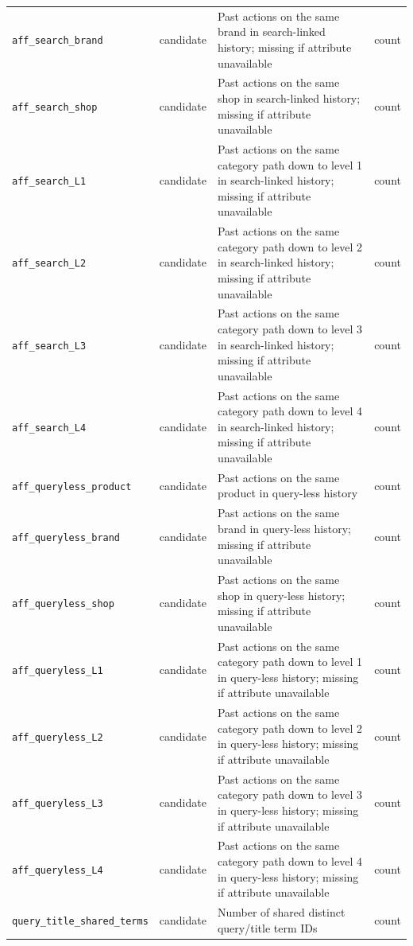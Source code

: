 \documentclass[11pt,a4paper]{article}
\begin{document}
{\begin{longtable}{>{\raggedright\arraybackslash}p{3.7cm} >{\raggedright\arraybackslash}p{2.3cm} >{\raggedright\arraybackslash}p{6.0cm} >{\raggedright\arraybackslash}p{2.6cm}}
\texttt{aff\_search\_brand} & candidate & Past actions on the same brand in search-linked history; missing if attribute unavailable & count \\
\texttt{aff\_search\_shop} & candidate & Past actions on the same shop in search-linked history; missing if attribute unavailable & count \\
\texttt{aff\_search\_L1} & candidate & Past actions on the same category path down to level 1 in search-linked history; missing if attribute unavailable & count \\
\texttt{aff\_search\_L2} & candidate & Past actions on the same category path down to level 2 in search-linked history; missing if attribute unavailable & count \\
\texttt{aff\_search\_L3} & candidate & Past actions on the same category path down to level 3 in search-linked history; missing if attribute unavailable & count \\
\texttt{aff\_search\_L4} & candidate & Past actions on the same category path down to level 4 in search-linked history; missing if attribute unavailable & count \\
\texttt{aff\_queryless\_product} & candidate & Past actions on the same product in query-less history & count \\
\texttt{aff\_queryless\_brand} & candidate & Past actions on the same brand in query-less history; missing if attribute unavailable & count \\
\texttt{aff\_queryless\_shop} & candidate & Past actions on the same shop in query-less history; missing if attribute unavailable & count \\
\texttt{aff\_queryless\_L1} & candidate & Past actions on the same category path down to level 1 in query-less history; missing if attribute unavailable & count \\
\texttt{aff\_queryless\_L2} & candidate & Past actions on the same category path down to level 2 in query-less history; missing if attribute unavailable & count \\
\texttt{aff\_queryless\_L3} & candidate & Past actions on the same category path down to level 3 in query-less history; missing if attribute unavailable & count \\
\texttt{aff\_queryless\_L4} & candidate & Past actions on the same category path down to level 4 in query-less history; missing if attribute unavailable & count \\
\texttt{query\_title\_shared\_terms} & candidate & Number of shared distinct query/title term IDs & count \\

\end{longtable}}
\end{document}
